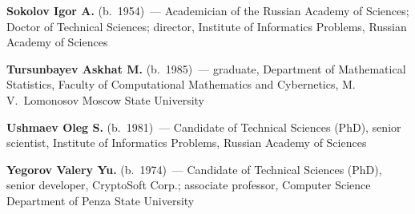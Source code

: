 \begin{multicols}{2}
\vspace*{6pt}

\noindent %
\textbf{Sokolov Igor A.} (b.\ 1954)~--- Academician of the Russian Academy of Sciences;
Doctor of Technical Sciences; director,
Institute of Informatics Problems,  Russian Academy of Sciences


\vspace*{6pt}

\noindent %
\textbf{Tursunbayev Askhat M.} (b.\ 1985)~--- graduate, 
Department of Mathematical
Statistics, Faculty of Computational Mathematics and Cybernetics, 
M.\,V.~Lomonosov Moscow State University

\vspace*{6pt}


\noindent %
\textbf{Ushmaev Oleg S.} (b.\ 1981)~--- 
Candidate of Technical Sciences (PhD), senior scientist,
Institute of Informatics Problems,  Russian Academy of Sciences
\vspace*{6pt}

\noindent %
\textbf{Yegorov Valery Yu.} (b.\ 1974)~--- Candidate of Technical 
Sciences (PhD),
senior developer, \mbox{CryptoSoft} Corp.;
associate professor, Computer Science Department of Penza State University

\end{multicols}